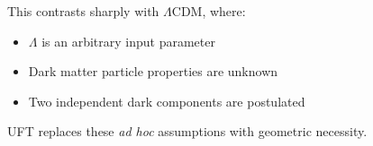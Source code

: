 This contrasts sharply with $\Lambda$CDM, where:
\begin{itemize}
    \item $\Lambda$ is an arbitrary input parameter
    \item Dark matter particle properties are unknown
    \item Two independent dark components are postulated
\end{itemize}

UFT replaces these {\it ad hoc} assumptions with geometric necessity.